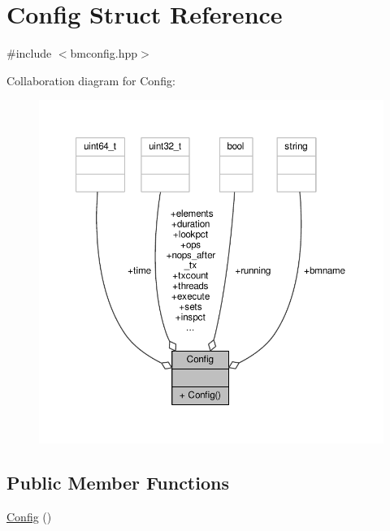 \hypertarget{structConfig}{\section{Config Struct Reference}
\label{structConfig}
}


{\ttfamily \#include $<$bmconfig.\-hpp$>$}



Collaboration diagram for Config\-:
\nopagebreak
\begin{figure}[H]
\begin{center}
\leavevmode
\includegraphics[width=350pt]{structConfig__coll__graph}
\end{center}
\end{figure}
\subsection*{Public Member Functions}
\begin{DoxyCompactItemize}
\item 
\hyperlink{structConfig_abd0c571c116924871e30444b192b792a}{Config} ()
\end{DoxyCompactItemize}
